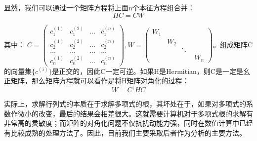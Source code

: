 显然，我们可以通过一个矩阵方程将上面n个本征方程组合并：
\begin{equation}
    HC=CW
\end{equation}

其中：
$C=\begin{pmatrix}c_{1}^{(1)}&c_{1}^{(2)}&\dots&c_{1}^{(n)}\\c_{2}^{(1)}&c_{2}^{(2)}&\dots&c_{2}^{(n)}\\ \dots&\dots&\dots&\dots\\c_{n}^{(1)}&c_{n}^{(2)}&\dots&c_{n}^{(n)}\end{pmatrix},W=\begin{pmatrix}W_1&\quad&\quad&\quad\\ \quad&W_2&\quad&\quad \\ \quad&\quad&\ddots&\quad\\ \quad &\quad&\quad&W_n \end{pmatrix}$。组成矩阵C的向量集$\{c^{(i)}\}$是正交的，因此C一定可逆。如果H是Hermitian，则C是一定是幺正矩阵，那么矩阵方程就可以看作是将H矩阵对角化的过程：
\begin{equation}
    W=C^\dagger H C
\end{equation}

实际上，求解行列式的本质在于求解多项式的根，其坏处在于，如果对多项式的系数作微小的改变，最后的结果会相差很大。这就需要计算机对于多项式根的求解有非常高的灵敏度；而矩阵的对角化问题不仅抗扰动能力强，同时在数值计算中已经有比较成熟的处理方法了。因此，目前我们主要采取后者作为分析的主要方法。